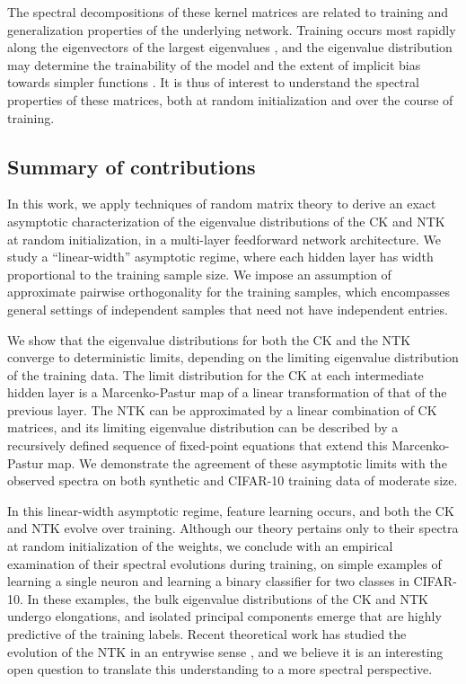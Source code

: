 \documentclass{article}
\theoremstyle{definition}
\newcommand{\1}{\mathbf{1}}
\begin{document}
The spectral decompositions of these kernel matrices are related to
training and generalization properties of the underlying network.
Training occurs most rapidly along the
eigenvectors of the largest eigenvalues \cite{advani2017high}, and the
eigenvalue distribution may determine the trainability of the model and the
extent of implicit bias towards simpler
functions \cite{xiao2019disentangling,yang2019fine}. It is thus of interest to
understand the spectral properties of these matrices, both at random
initialization and over the course of training.

\subsection{Summary of contributions}

In this work, we apply techniques of random matrix theory to derive an exact
asymptotic characterization of the eigenvalue distributions of the CK and NTK at
random initialization, in a multi-layer feedforward network architecture. We
study a ``linear-width'' asymptotic regime, where each hidden layer has width
proportional to the training sample size. We impose an assumption
of approximate pairwise orthogonality for the training samples, which
encompasses general settings of independent samples that need not have
independent entries.

We show that the eigenvalue distributions
for both the CK and the NTK converge to deterministic limits, depending on the
limiting eigenvalue distribution of the training data. The limit distribution
for the CK at each intermediate hidden layer is a Marcenko-Pastur map of a
linear transformation of that of the previous layer. The NTK can be approximated
by a linear combination of CK matrices, and its limiting eigenvalue distribution can be described by a recursively defined sequence of fixed-point equations that extend
this Marcenko-Pastur map. We demonstrate the agreement of these asymptotic
limits with the observed spectra on both synthetic and CIFAR-10 training data of moderate size.

In this linear-width asymptotic regime, feature learning occurs, and both the
CK and NTK evolve over training.
Although our theory pertains only to their spectra at random
initialization of the weights, we conclude with an empirical examination of
their spectral evolutions during training,
on simple examples of learning a single neuron and learning a
binary classifier for two classes in CIFAR-10. In these examples, the bulk
eigenvalue distributions of the CK and NTK undergo elongations, and
isolated principal components emerge that are highly predictive of the 
training labels. Recent theoretical work has studied the evolution of the NTK 
in an entrywise sense \cite{huang2019dynamics,dyer2019asymptotics}, and
we believe it is an interesting open question to translate this understanding
to a more spectral perspective.
\end{document}
